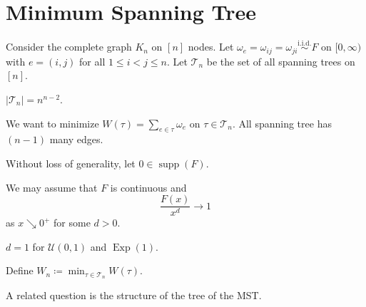 \section{Minimum Spanning Tree}
Consider the complete graph \(K_n\) on \([n]\) nodes. Let \(\omega _e = \omega _{ij} = \omega _{ji} \overset{\text{i.i.d.} }{\sim } F\) on \([0, \infty )\) with \(e = (i, j)\) for all \(1 \leq i < j \leq n\). Let \(\mathcal{T} _n\) be the set of all spanning trees on \([n]\).

\begin{note}
	\(\lvert \mathcal{T} _n \rvert = n^{n-2}\).
\end{note}

We want to minimize \(W(\tau ) = \sum_{e \in \tau } \omega _e \) on \(\tau \in \mathcal{T} _n\). All spanning tree has \((n-1)\) many edges.

\begin{note}
	Without loss of generality, let \(0 \in \operatorname{supp}(F) \).
\end{note}

We may assume that \(F\) is continuous and
\[
	\frac{F(x)}{x^d}
	\to 1
\]
as \(x \searrow 0^+\) for some \(d > 0\).

\begin{eg}
	\(d=1\) for \(\mathcal{U} (0, 1)\) and \(\operatorname{Exp}(1) \).
\end{eg}

Define \(W_n \coloneqq \min _{\tau \in \mathcal{T} _n} W(\tau )\).

\begin{remark}
	A related question is the structure of the tree of the MST.
\end{remark}

